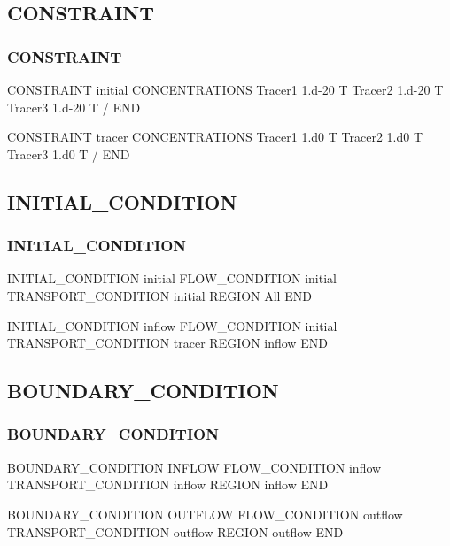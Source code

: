 \documentclass{beamer}
\begin{document}

\subsection{CONSTRAINT}
\begin{frame}\frametitle{CONSTRAINT}
	
	\begin{semiverbatim}
CONSTRAINT initial
  CONCENTRATIONS
    Tracer1 1.d-20 T
    Tracer2 1.d-20 T
    Tracer3 1.d-20 T
  /
END

CONSTRAINT tracer
  CONCENTRATIONS
    Tracer1 1.d0 T
    Tracer2 1.d0 T
    Tracer3 1.d0 T
  /
END
	\end{semiverbatim}
\end{frame}


\subsection{INITIAL\_CONDITION}
\begin{frame}\frametitle{INITIAL\_CONDITION}
	
	\begin{semiverbatim}
INITIAL_CONDITION initial
  FLOW_CONDITION initial
  TRANSPORT_CONDITION initial
  REGION All
END

INITIAL_CONDITION inflow
  FLOW_CONDITION initial
  TRANSPORT_CONDITION tracer
  REGION inflow
END
	\end{semiverbatim}
	
\end{frame}


\subsection{BOUNDARY\_CONDITION}
\begin{frame}\frametitle{BOUNDARY\_CONDITION}
	
	\begin{semiverbatim}
BOUNDARY_CONDITION INFLOW
  FLOW_CONDITION inflow
  TRANSPORT_CONDITION inflow
  REGION inflow
END

BOUNDARY_CONDITION OUTFLOW
  FLOW_CONDITION outflow
  TRANSPORT_CONDITION outflow
  REGION outflow
END
	\end{semiverbatim}
	
\end{frame}
\end{document}
